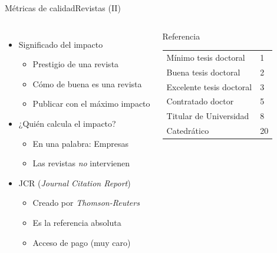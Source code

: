 \documentclass{beamer}
\begin{document}
\begin{frame}{Métricas de calidad}{Revistas (II)}
	\begin{columns}
 	\begin{itemize}
		\item Significado del impacto
			\begin{itemize}
			\item Prestigio de una revista
			\item Cómo de buena es una revista
			\item Publicar con el máximo impacto
			\end{itemize}
		\item ¿Quién calcula el impacto?
			\begin{itemize}
			\item En una palabra: Empresas
			\item Las revistas \textit{no} intervienen
			\end{itemize}
		\item JCR (\textit{Journal Citation Report})
			\begin{itemize}
			\item Creado por \textit{Thomson-Reuters}
			\item Es la referencia absoluta
			\item Acceso de pago (muy caro)
			\end{itemize}
	\end{itemize}

	\begin{center}
		\begin{block}{Referencia}
			\scriptsize{
			\begin{table}[h]
			\begin{center}
			\begin{tabular}{ll}
			Mínimo tesis doctoral	& 1	\\ 
			Buena tesis doctoral	& 2	\\ 
			Excelente tesis doctoral& 3	\\ 
			Contratado doctor		& 5	\\ 
			Titular de Universidad	& 8	\\ 
			Catedrático				& 20\\ 
			\end{tabular}
			\end{center}
			\end{table}
		}
		\end{block}
	\end{center}
	\end{columns}
\end{frame}
\end{document}
